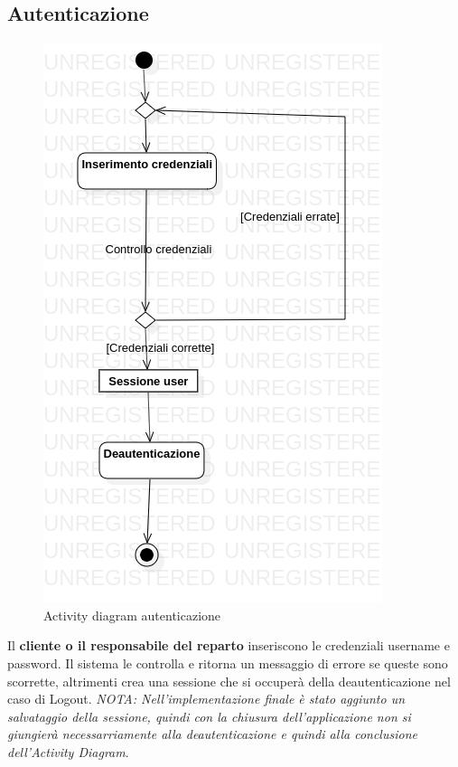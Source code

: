 \documentclass[12pt, a4paper]{article}
\begin{document}
\subsection{Autenticazione}
\begin{figure}[h]
\centering
\includegraphics{Use Case Model!Autenticazione!ActivityAutenticazione!ActivityDiagramAutenticazione_8.png}
\caption{Activity diagram autenticazione}
\end{figure}

Il \textbf{cliente o il responsabile del reparto} inseriscono le credenziali username e password.
Il sistema le controlla e ritorna un messaggio di errore se queste sono scorrette, altrimenti crea una sessione che si occuperà della deautenticazione nel caso di Logout.\break
\emph{NOTA: Nell'implementazione finale è stato aggiunto un salvataggio della sessione, quindi con la chiusura dell'applicazione non si giungierà necessarriamente alla deautenticazione e quindi alla conclusione dell'Activity Diagram}.
\end{document}

